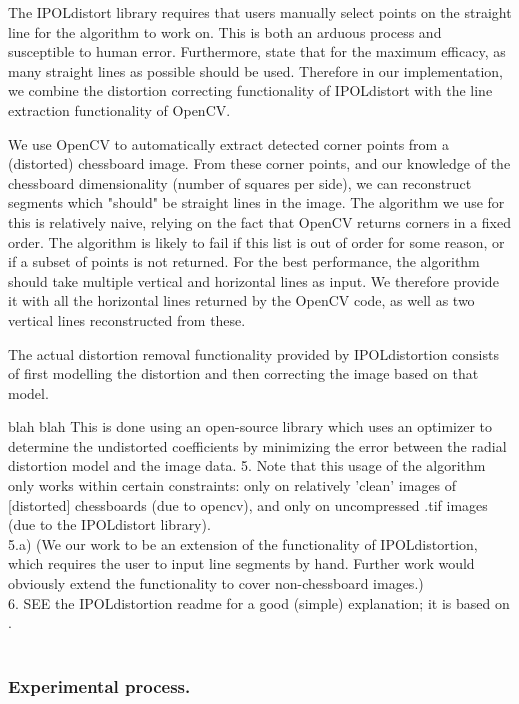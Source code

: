 The IPOLdistort library requires that users manually select points on the straight line for the algorithm to work on. This is both an arduous process and susceptible to human error. Furthermore, \cite{algebraic-distortion} state that for the maximum efficacy, as many straight lines as possible should be used. Therefore in our implementation, we combine the distortion correcting functionality of IPOLdistort with the line extraction functionality of OpenCV. 

We use OpenCV to automatically extract detected corner points from a (distorted) chessboard image. From these corner points, and our knowledge of the chessboard dimensionality (number of squares per side), we can reconstruct segments which "should" be straight lines in the image. The algorithm we use for this is relatively naive, relying on the fact that OpenCV returns corners in a fixed order. The algorithm is likely to fail if this list is out of order for some reason, or if a subset of points is not returned. For the best performance, the algorithm should take multiple vertical and horizontal lines as input. We therefore provide it with all the horizontal lines returned by the OpenCV code, as well as two vertical lines reconstructed from these.

The actual distortion removal functionality provided by IPOLdistortion consists of first modelling the distortion and then correcting the image based on that model.



blah blah
This is done using an open-source library which uses an optimizer to determine the undistorted coefficients by minimizing the error between the radial distortion model and the image data.
5. Note that this usage of the algorithm only works within certain constraints: only on relatively 'clean' images of [distorted] chessboards (due to opencv), and only on uncompressed .tif images (due to the IPOLdistort library).\\
5.a) (We our work to be an extension of the functionality of IPOLdistortion, which requires the user to input line segments by hand. Further work would obviously extend the functionality to cover non-chessboard images.)\\
6. SEE the IPOLdistortion readme for a good (simple) explanation; it is based on \cite{algebraic-distortion}.\\\\



\subsubsection{Experimental process.}

